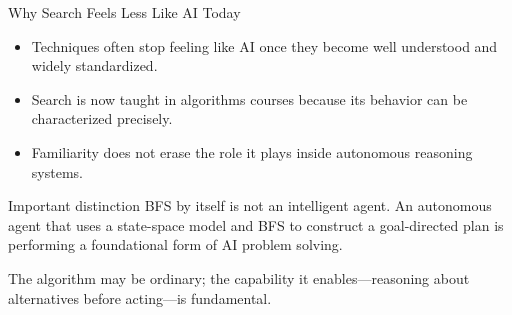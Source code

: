 \documentclass[aspectratio=169,10pt]{beamer}
\begin{document}
\begin{frame}[shrink=20]{Why Search Feels Less Like AI Today}
  \begin{itemize}
    \item Techniques often stop feeling like AI once they become well understood and widely standardized.
    \item Search is now taught in algorithms courses because its behavior can be characterized precisely.
    \item Familiarity does not erase the role it plays inside autonomous reasoning systems.
  \end{itemize}

  \begin{alertblock}{Important distinction}
    BFS by itself is not an intelligent agent. An autonomous agent that uses a state-space model and BFS to construct a goal-directed plan is performing a foundational form of AI problem solving.
  \end{alertblock}

  \begin{keyidea}
    The algorithm may be ordinary; the capability it enables---reasoning about alternatives before acting---is fundamental.
  \end{keyidea}
\end{frame}

\end{document}
